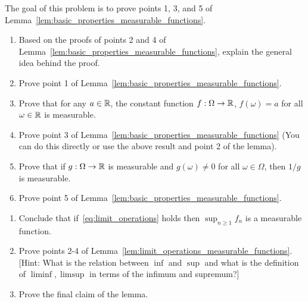 \begin{problem}\label{prb:basic_properties_measurable_functions}
The goal of this problem is to prove points 1, 3, and 5 of Lemma~\ref{lem:basic_properties_measurable_functions}.
\begin{enumerate}[label=(\alph*)]
\item Based on the proofs of points 2 and 4 of Lemma~\ref{lem:basic_properties_measurable_functions}, explain the general idea behind the proof.
\item Prove point 1 of Lemma~\ref{lem:basic_properties_measurable_functions}.
\item Prove that for any $a \in \mathbb R$, the constant function $f : \Omega \to \mathbb R$, $f(\omega) = a$ for all $\omega \in \mathbb R$ is measurable.
\item Prove point 3 of Lemma~\ref{lem:basic_properties_measurable_functions} (You can do this directly or use the above result and point 2 of the lemma).
\item Prove that if $g : \Omega \to \mathbb R$ is measurable and $g(\omega) \ne 0$ for all $\omega \in \Omega$, then $1/g$ is measurable.
\item Prove point 5 of Lemma~\ref{lem:basic_properties_measurable_functions}.
\end{enumerate}
\end{problem}

\begin{problem}\label{prb:limit_operations_measurable_functions}
\hfil
\begin{enumerate}[label=(\alph*)]
\item Conclude that if~\eqref{eq:limit_operations} holds then $\sup_{n \ge 1} f_n$ is a measurable function.
\item Prove points 2-4 of Lemma~\ref{lem:limit_operations_measurable_functions}. [Hint: What is the relation between $\inf$ and $\sup$ and what is the definition of $\liminf, \limsup$ in terms of the infimum and supremum?]
\item Prove the final claim of the lemma.
\end{enumerate}
\end{problem}

